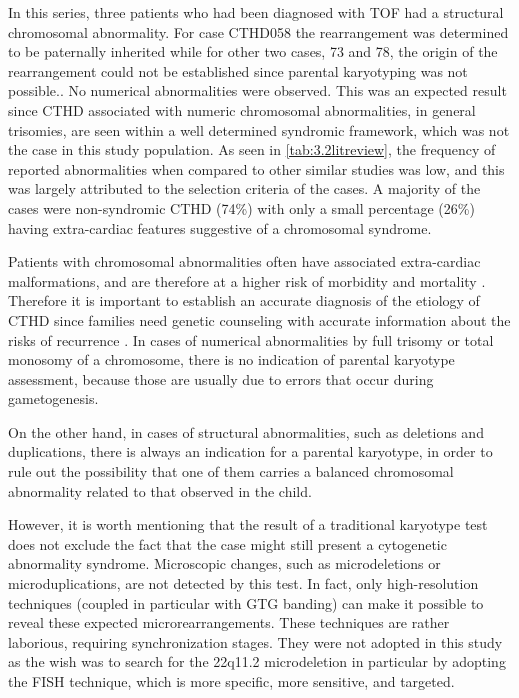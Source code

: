 \begin{refsection}
In this series, three patients who had been diagnosed with TOF had a structural chromosomal abnormality. For case CTHD058 the rearrangement was determined to be paternally inherited while for other two cases, 73 and 78, the origin of the rearrangement could not be established since parental karyotyping was not possible.. No numerical abnormalities were observed. This was an expected result since CTHD associated with numeric chromosomal abnormalities, in general trisomies, are seen within a well determined syndromic framework, which was not the case in this study population. As seen in \cref{tab:3.2litreview}, the frequency of reported abnormalities when compared to other similar studies was low, and this was largely attributed to the selection criteria of the cases. A majority of the cases were non-syndromic CTHD (74\%) with only a small percentage (26\%) having extra-cardiac features suggestive of a chromosomal syndrome. 

Patients with chromosomal abnormalities often have associated extra-cardiac malformations, and are therefore at a higher risk of morbidity and mortality \cite{hanna1994genetic, marino2000congenital, begic2003epidemiological, gonzalez2009universal}. Therefore it is important to establish an accurate diagnosis of the etiology of CTHD since families need genetic counseling with accurate information about the risks of recurrence \cite{prasad2002genetics}. In cases of numerical abnormalities by full trisomy or total monosomy of a chromosome, there is no indication of parental karyotype assessment, because those are usually due to errors that occur during gametogenesis.

On the other hand, in cases of structural abnormalities, such as deletions and duplications, there is always an indication for a parental karyotype, in order to rule out the possibility that one of them carries a balanced chromosomal abnormality related to that observed in the child. 

However, it is worth mentioning that the result of a traditional karyotype test does not exclude the fact that the case might still present a cytogenetic abnormality syndrome. Microscopic changes, such as microdeletions or microduplications, are not detected by this test. In fact, only high-resolution techniques (coupled in particular with GTG banding) can make it possible to reveal these expected microrearrangements. These techniques are rather laborious, requiring synchronization stages. They were not adopted in this study as the wish was to search for the 22q11.2 microdeletion in particular by adopting the FISH technique, which is more specific, more sensitive, and targeted.


\end{refsection}
